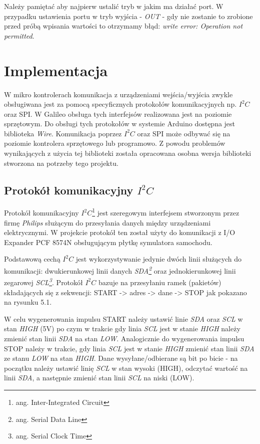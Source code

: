 \documentclass{xmgr}
\begin{document}
Należy pamiętać aby najpierw ustalić tryb w jakim ma działać port. W przypadku ustawienia portu w tryb wyjścia - \emph{OUT} - gdy nie zostanie to zrobione przed próbą wpisania wartości to otrzymamy błąd: \emph{write error: Operation not permitted}.


\chapter{Implementacja}
W mikro kontrolerach komunikacja z urządzeniami wejścia/wyjścia zwykle obsługiwana jest za pomocą specyficznych protokołów komunikacyjnych np. $I^2C$ oraz SPI. W Galileo obsługa tych interfejsów realizowana jest na poziomie sprzętowym. Do obsługi tych protokołów w systemie Arduino dostępna jest biblioteka \emph{Wire}. Komunikacja poprzez $I^2C$  oraz SPI może odbywać się na poziomie kontrolera sprzętowego lub programowo. Z powodu problemów wynikających z użycia tej biblioteki została opracowana osobna wersja biblioteki stworzona na potrzeby tego projektu.

\section{Protokół komunikacyjny $I^2C$}
Protokół komunikacyjny \emph{$I^2C$}\footnote{ang. Inter-Integrated Circuit} jest szeregowym interfejsem stworzonym przez firmę \emph{Philips} służącym do przesyłania danych między urządzeniami elektrycznymi. W projekcie protokół ten został użyty do komunikacji z I/O Expander PCF 8574N obsługującym płytkę symulatora samochodu.

Podstawową cechą \emph{$I^2C$} jest wykorzystywanie jedynie dwóch linii służących do komunikacji: dwukierunkowej linii danych \emph{SDA\footnote{ang. Serial Data Line}} oraz jednokierunkowej linii zegarowej \emph{SCL\footnote{ang. Serial Clock Time}}. Protokół $I^2C$ bazuje na przesyłaniu ramek (pakietów) składających się z sekwencji: START -> adres -> dane -> STOP jak pokazano na rysunku 5.1.

W celu wygenerowania impulsu START należy ustawić linie \emph{SDA} oraz \emph{SCL} w stan \emph{HIGH} (5V) po czym w trakcie gdy linia \emph{SCL} jest w stanie \emph{HIGH} należy zmienić stan linii \emph{SDA} na stan \emph{LOW}. Analogicznie do wygenerowania impulsu STOP należy w trakcie, gdy linia \emph{SCL} jest w stanie \emph{HIGH} zmienić stan linii \emph{SDA} ze stanu \emph{LOW} na stan \emph{HIGH}. Dane wysyłane/odbierane są bit po bicie - na początku należy ustawić linię \emph{SCL} w stan wysoki (HIGH), odczytać wartość na linii \emph{SDA}, a następnie zmienić stan linii \emph{SCL} na niski (LOW).
\end{document}
